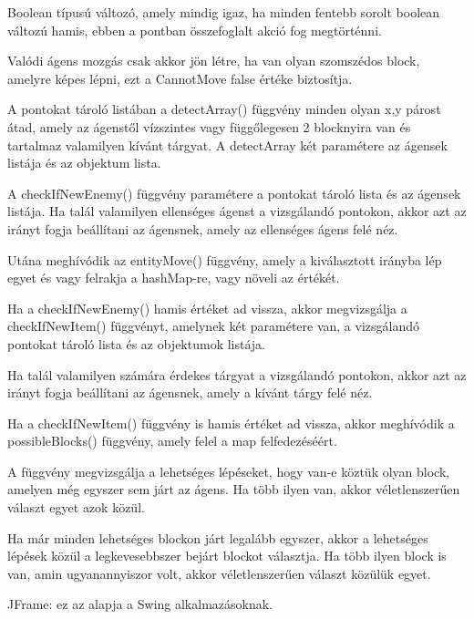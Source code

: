 Boolean típusú változó, amely mindig igaz, ha minden fentebb sorolt boolean változú hamis, ebben a pontban összefoglalt akció fog megtörténni.

Valódi ágens mozgás csak akkor jön létre, ha van olyan szomszédos block, amelyre képes lépni, ezt a CannotMove false értéke biztosítja.

A pontokat tároló listában a detectArray() függvény minden olyan x,y párost átad, amely az ágenstől vízszintes vagy függőlegesen 2 blocknyira van
és tartalmaz valamilyen kívánt tárgyat. A detectArray két paramétere az ágensek listája és az objektum lista.

A checkIfNewEnemy() függvény paramétere a pontokat tároló lista és az ágensek listája. Ha talál valamilyen ellenséges ágenst
a vizsgálandó pontokon, akkor azt az irányt fogja beállítani az ágensnek, amely az ellenséges ágens felé néz.

Utána meghívódik az entityMove() függvény, amely a kiválasztott irányba lép egyet és vagy felrakja a hashMap-re, vagy növeli az értékét.

Ha a checkIfNewEnemy() hamis értéket ad vissza, akkor megvizsgálja a checkIfNewItem() függvényt, amelynek két paramétere van, a
vizsgálandó pontokat tároló lista és az objektumok listája.

Ha talál valamilyen számára érdekes tárgyat a vizsgálandó pontokon, akkor azt az irányt fogja beállítani az ágensnek, amely a kívánt tárgy felé néz.

Ha a checkIfNewItem() függvény is hamis értéket ad vissza, akkor meghívódik a possibleBlocks() függvény, amely felel a map felfedezéséért.

A függvény megvizsgálja a lehetséges lépéseket, hogy van-e köztük olyan block, amelyen még egyszer sem járt az ágens. Ha több ilyen van, akkor
véletlenszerűen választ egyet azok közül.

Ha már minden lehetséges blockon járt legalább egyszer, akkor a lehetséges lépések közül a legkevesebbszer bejárt blockot választja. Ha 
több ilyen block is van, amin ugyanannyiszor volt, akkor véletlenszerűen választ közülük egyet.


JFrame: ez az alapja a Swing alkalmazásoknak.

\medskip

